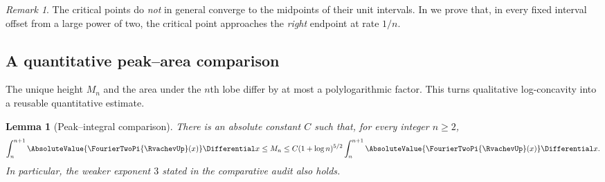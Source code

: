 \documentclass[11pt,oneside]{article}
\numberwithin{equation}{section}
\newtheorem{lemma}[theorem]{Lemma}
\theoremstyle{definition}
\theoremstyle{remark}
\newtheorem{remark}[theorem]{Remark}
\begin{document}
\begin{remark}
The critical points do \emph{not} in general converge to the midpoints of their unit
intervals.  In  we prove that, in every fixed interval offset
from a large power of two, the critical point approaches the \emph{right} endpoint at rate
$1/n$.
\end{remark}

\subsection{A quantitative peak--area comparison}

The unique height $M_n$ and the area under the $n$th lobe differ by at most a
polylogarithmic factor.  This turns qualitative log-concavity into a reusable quantitative
estimate.

\begin{lemma}[Peak--integral comparison]
\label{lem:peak-integral}
There is an absolute constant $C$ such that, for every integer $n\ge2$,
\begin{equation}
 \int_n^{n+1}\AbsoluteValue{\FourierTwoPi{\RvachevUp}(x)}\Differential x
 \le M_n
 \le C(1+\log n)^{5/2}
       \int_n^{n+1}\AbsoluteValue{\FourierTwoPi{\RvachevUp}(x)}\Differential x.
 \label{eq:peak-integral-comparison}
\end{equation}
In particular, the weaker exponent $3$ stated in the comparative audit also holds.
\end{lemma}
\end{document}
